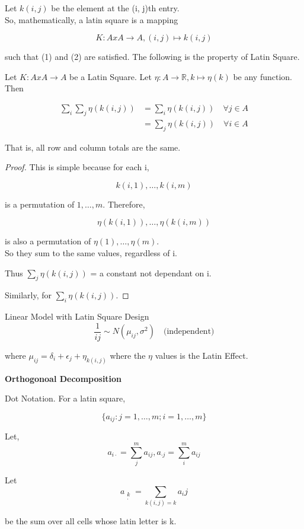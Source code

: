 \documentclass[11pt,fleqn]{book} %
\begin{document}
Let $k(i, j)$ be the element at the (i, j)th entry. \\

So, mathematically, a latin square is a mapping 

		$$K: A x A \rightarrow A, (i, j) \mapsto k(i,j) $$

such that (1) and (2) are satisfied. The following is the property of Latin Square. 

\begin{theorem}
	Let $K: A x A \rightarrow A$ be a Latin Square. Let $\eta: A \rightarrow \mathbb{R},k \mapsto \eta(k) $ be any function. Then

			\begin{align*}
				\sum_i \sum_j \eta(k(i,j)) &= \sum_i \eta(k(i,j))\quad \forall j \in A\\
						&= \sum_j \eta(k(i,j)) \quad \forall i \in A
			\end{align*}  

	That is, all row and column totals are the same. 
\end{theorem}

\begin{proof}
	This is simple because for each i, 

			$$ k(i, 1), \dots, k(i,m)$$

	is a permutation of $1, \dots, m$. Therefore, 

			$$\eta(k(i,1)), \dots, \eta(k(i,m)) $$

	is also a permutation of $\eta(1), \dots, \eta(m)$.\\

	So they sum to the same values, regardless of i. 

	Thus $\sum_j \eta(k(i,j))$ = a constant not dependant on i.

	Similarly, for $\sum_i \eta(k(i,j))$.

\end{proof}


Linear Model with Latin Square Design\\

		$$ \frac{1}{ij} \sim N(\mu_{ij}, \sigma^2) \quad \text{(independent)}$$

where $\mu_{ij} = \delta_i + \epsilon_j + \eta_{k(i,j)} $ where the $\eta$ values is the Latin Effect.


\textbf{Orthogonoal Decomposition}\\


\begin{notation}
	Dot Notation. For a latin square, 

			$$\{a_{ij}: j = 1, \dots, m; i = 1, \dots, m \} $$
 
 Let, 
			$$a_{i \cdot} = \sum_j^m a_{ij}, a_{ \cdot j} = \sum_i^m a_{ij}$$

Let 
			$$ a_{\begin{matrix}
				k\\
				\cdot
			\end{matrix}} = \sum_{k(i,j) = k} a_ij$$

	be the sum over all cells whose latin letter is k. 
\end{notation}
\end{document}
